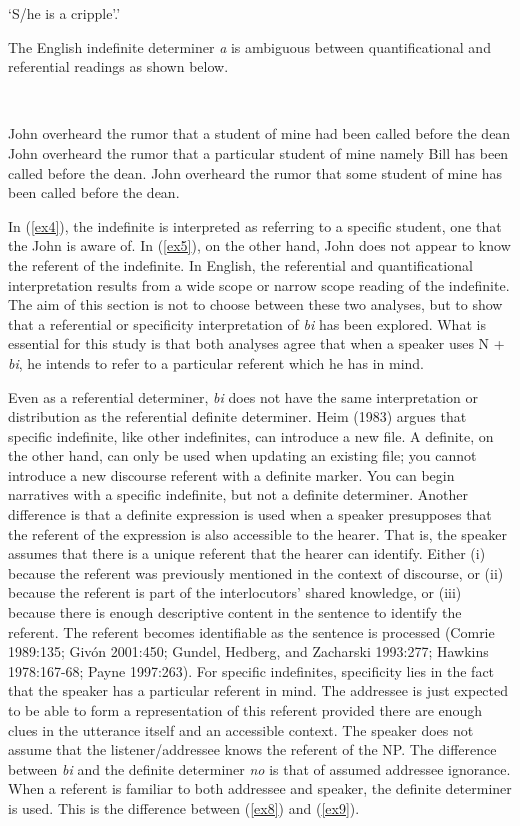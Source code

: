 \documentclass[output=paper,modfonts]{langsci/langscibook}
\begin{document}
\glt ‘S/he is a cripple’.'
\z \z 

The English indefinite determiner \emph{a} is ambiguous between quantificational and referential readings as shown below.

\ea
{}\\
\ea\label{ex3}

John overheard the rumor that a student of mine had been called before the dean
\ea \label{ex4} John overheard the rumor that a particular student of mine namely Bill has been called before the dean.
\ex \label{ex5} John overheard the rumor that some student of mine has been called before the dean.
\z\z 
\z 

In (\ref{ex4}), the indefinite is interpreted as referring to a specific student, one that the John is aware of. In (\ref{ex5}), on the other hand, John does not appear to know the referent of the indefinite. In English, the referential and quantificational interpretation results from a wide scope or narrow scope reading of the indefinite. 
The aim of this section is not to choose between these two analyses, but to show that a referential or specificity interpretation of \emph{bi} has been explored. What is essential for this study is that both analyses agree that when a speaker uses  N + \emph{bi}, he intends to refer to a particular referent which he has in mind.            


Even as a referential determiner, \emph{bi} does not have the same interpretation or distribution as the referential definite determiner. Heim (1983) argues that specific indefinite, like other indefinites, can introduce a new file. A definite, on the other hand, can only be used when updating an existing file; you cannot introduce a new discourse referent with a definite marker. You can begin narratives with a specific indefinite, but not a definite determiner. Another difference is that a definite expression is used when a speaker presupposes that the referent of the expression is also accessible to the hearer. That is, the speaker assumes that there is a unique referent that the hearer can identify. Either (i) because the referent was previously mentioned in the context of discourse, or (ii) because the referent is part of the interlocutors’ shared knowledge, or (iii) because there is enough descriptive content in the sentence to identify the referent.  The referent becomes identifiable as the sentence is processed (Comrie 1989:135; Giv\'on 2001:450; Gundel, Hedberg, and Zacharski 1993:277; Hawkins 1978:167-68; Payne 1997:263). For specific indefinites, specificity lies in the fact that the speaker has a particular referent in mind. The addressee is just expected to be able to form a representation of this referent provided there are enough clues in the utterance itself and an accessible context. The speaker does not assume that the listener/addressee knows the referent of the NP. The difference between \emph{bi} and the definite determiner \emph{no} is that of assumed addressee ignorance. When a referent is familiar to both addressee and speaker, the definite determiner is used. This is the difference between (\ref{ex8}) and (\ref{ex9}). 
\end{document}
